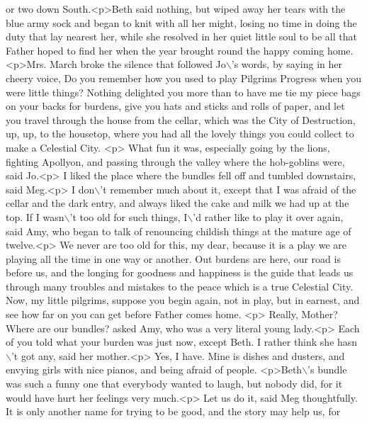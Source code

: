 \begin{DoxyCode}
{       or two down South.<p>Beth said nothing, but wiped away her tears with the blue army sock and began to knit
       with all her might, losing no time in doing the duty that lay nearest her, while she resolved in her quiet
       little soul to be all that Father hoped to find her when the year brought round the happy coming home.<p>Mrs.
       March broke the silence that followed Jo\(\backslash\)'s words, by saying in her cheery voice,  Do you remember how you
       used to play Pilgrims Progress when you were little things? Nothing delighted you more than to have me tie my
       piece bags on your backs for burdens, give you hats and sticks and rolls of paper, and let you travel
       through the house from the cellar, which was the City of Destruction, up, up, to the housetop, where you had all
       the lovely things you could collect to make a Celestial City. <p> What fun it was, especially going by the
       lions, fighting Apollyon, and passing through the valley where the hob-goblins were,  said Jo.<p> I liked the
       place where the bundles fell off and tumbled downstairs,  said Meg.<p> I don\(\backslash\)'t remember much about it,
       except that I was afraid of the cellar and the dark entry, and always liked the cake and milk we had up at the
       top. If I wasn\(\backslash\)'t too old for such things, I\(\backslash\)'d rather like to play it over again,  said Amy, who began to
       talk of renouncing childish things at the mature age of twelve.<p> We never are too old for this, my dear,
       because it is a play we are playing all the time in one way or another. Out burdens are here, our road is
       before us, and the longing for goodness and happiness is the guide that leads us through many troubles and
       mistakes to the peace which is a true Celestial City. Now, my little pilgrims, suppose you begin again, not in
       play, but in earnest, and see how far on you can get before Father comes home. <p> Really, Mother? Where are
       our bundles?  asked Amy, who was a very literal young lady.<p> Each of you told what your burden was just
       now, except Beth. I rather think she hasn\(\backslash\)'t got any,  said her mother.<p> Yes, I have. Mine is dishes and
       dusters, and envying girls with nice pianos, and being afraid of people. <p>Beth\(\backslash\)'s bundle was such a funny one
       that everybody wanted to laugh, but nobody did, for it would have hurt her feelings very much.<p> Let us do
       it,  said Meg thoughtfully.  It is only another name for trying to be good, and the story may help us, for
}
\end{DoxyCode}
